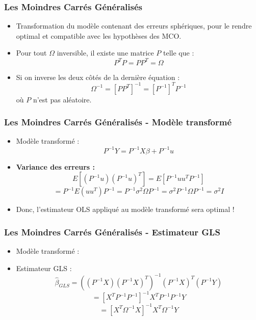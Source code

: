\documentclass{beamer}
\begin{document}
\begin{frame}
\frametitle{Les Moindres Carrés Généralisés}
\begin{itemize}
    \item Transformation du modèle contenant des erreurs sphériques, pour le rendre optimal et compatible avec les hypothèses des MCO.
    \item Pour tout \( \Omega \) inversible, il existe une matrice \( P \) telle que :
    \[
    P^T P = P P^T = \Omega
    \]
    \item Si on inverse les deux côtés de la dernière équation :
    \[
    \Omega^{-1} = [P P^T]^{-1} = [P^{-1}]^T P^{-1}
    \]
    où \( P \) n’est pas aléatoire.
\end{itemize}
\end{frame}

\begin{frame}
\frametitle{Les Moindres Carrés Généralisés - Modèle transformé}
\begin{itemize}
    \item Modèle transformé :
    \[
    P^{-1} Y = P^{-1} X \beta + P^{-1} u
    \]
    \item \textbf{Variance des erreurs :}
    \[
    E\left[ (P^{-1} u) (P^{-1} u)^T \right] = E\left[ P^{-1} u u^T P^{-1} \right]
    \]
    \[
    = P^{-1} E(u u^T) P^{-1}
    = P^{-1} \sigma^2 \Omega P^{-1}
    = \sigma^2 P^{-1} \Omega P^{-1}
    = \sigma^2 I
    \]
    \item Donc, l’estimateur OLS appliqué au modèle transformé sera optimal !
\end{itemize}
\end{frame}

\begin{frame}
\frametitle{Les Moindres Carrés Généralisés - Estimateur GLS}
\begin{itemize}
    \item Modèle transformé :
    \item Estimateur GLS :
    \[
    \hat{\beta}_{GLS} = \left( (P^{-1} X) (P^{-1} X)^T \right)^{-1} (P^{-1} X)^T (P^{-1} Y)
    \]
    \[
    = \left[ X^T P^{-1} P^{-1} \right]^{-1} X^T P^{-1} P^{-1} Y
    \]
    \[
    = \left[ X^T \Omega^{-1} X \right]^{-1} X^T \Omega^{-1} Y
    \]
\end{itemize}
\end{frame}
\end{document}
